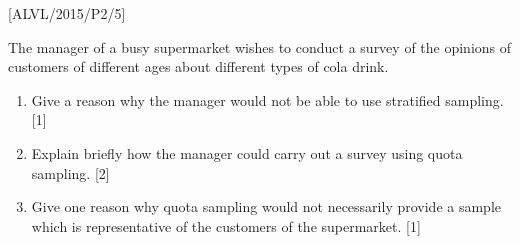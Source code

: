 \item {[}ALVL/2015/P2/5{]}

The manager of a busy supermarket wishes to conduct a survey of the
opinions of customers of different ages about different types of cola
drink. 
\begin{enumerate}
\item Give a reason why the manager would not be able to use stratified
sampling. \hfill{}{[}1{]}
\item Explain briefly how the manager could carry out a survey using quota
sampling. \hfill{}{[}2{]}
\item Give one reason why quota sampling would not necessarily provide a
sample which is representative of the customers of the supermarket.
\hfill{} {[}1{]}
\end{enumerate}
